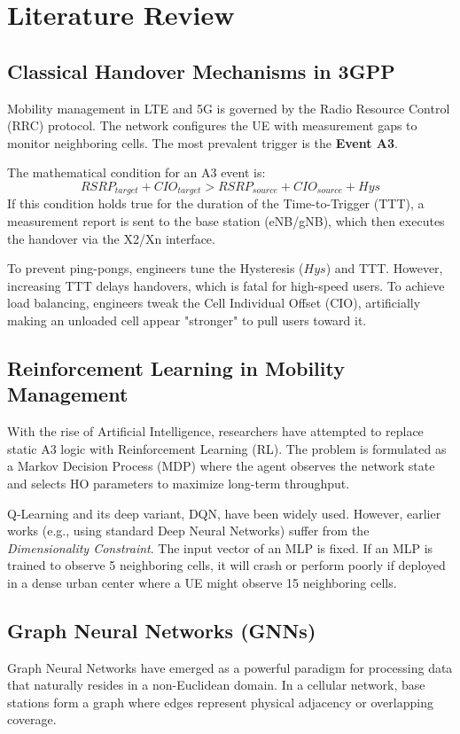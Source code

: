 \documentclass[12pt,a4paper,oneside]{report}
\begin{document}
\chapter{Literature Review}
\label{ch:lit}

\section{Classical Handover Mechanisms in 3GPP}
Mobility management in LTE and 5G is governed by the Radio Resource Control (RRC) protocol. The network configures the UE with measurement gaps to monitor neighboring cells. The most prevalent trigger is the \textbf{Event A3}.

The mathematical condition for an A3 event is:
\begin{equation}
    RSRP_{target} + CIO_{target} > RSRP_{source} + CIO_{source} + Hys
\end{equation}
If this condition holds true for the duration of the Time-to-Trigger (TTT), a measurement report is sent to the base station (eNB/gNB), which then executes the handover via the X2/Xn interface.

To prevent ping-pongs, engineers tune the Hysteresis ($Hys$) and TTT. However, increasing TTT delays handovers, which is fatal for high-speed users. To achieve load balancing, engineers tweak the Cell Individual Offset (CIO), artificially making an unloaded cell appear "stronger" to pull users toward it.

\section{Reinforcement Learning in Mobility Management}
With the rise of Artificial Intelligence, researchers have attempted to replace static A3 logic with Reinforcement Learning (RL). The problem is formulated as a Markov Decision Process (MDP) where the agent observes the network state and selects HO parameters to maximize long-term throughput.

Q-Learning and its deep variant, DQN, have been widely used. However, earlier works (e.g., using standard Deep Neural Networks) suffer from the \textit{Dimensionality Constraint}. The input vector of an MLP is fixed. If an MLP is trained to observe 5 neighboring cells, it will crash or perform poorly if deployed in a dense urban center where a UE might observe 15 neighboring cells.

\section{Graph Neural Networks (GNNs)}
Graph Neural Networks have emerged as a powerful paradigm for processing data that naturally resides in a non-Euclidean domain. In a cellular network, base stations form a graph where edges represent physical adjacency or overlapping coverage.
\end{document}
